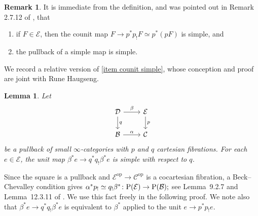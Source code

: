 \documentclass{amsart}
\numberwithin{theorem}{subsection}
\newtheorem{lemma}[theorem]{Lemma}
\theoremstyle{definition}
\newtheorem{remark}[theorem]{Remark}
\providecommand{\op}{\mathrm{op}}
\newcommand{\xE}{\mathcal{E}}
\newcommand{\xcc}{\mathcal{C}}
\newcommand{\Pre}{\name{P}}
\newcommand{\name}[1]{\ensuremath{\text{\textup{#1}}}}
\begin{document}
\begin{remark}\label{remark first simple properties}
It is immediate from the definition, and was pointed out in Remark 2.7.12 of \cite{ChuHaugseng}, that
\begin{enumerate}
\item if $F\in \xE$, then the counit map $F \to p^*p_! F \simeq p^*(pF)$ is simple, and \label{item counit simple}
\item the pullback of a simple map is simple. \label{item pullback simple}
\end{enumerate}
\end{remark}

We record a relative version of \eqref{item counit simple}, whose conception and proof are joint with Rune Haugseng.
\begin{lemma}\label{lemma: relative simple unit}
Let
\begin{equation}\label{eq pullback DEBC} \begin{tikzcd}
\mathcal{D} \rar{\beta} \dar{q} & \xE \dar{p} \\
\mathcal{B} \rar{\alpha} & \xcc
\end{tikzcd} \end{equation}
be a pullback of small $\infty$-categories with $p$ and $q$ cartesian fibrations.
For each $e\in \xE$, the unit map $\beta^*e \to q^*q_!\beta^*e$ is simple with respect to $q$.
\end{lemma}
Since the square is a pullback and $\xE^\op \to \xcc^\op$ is a cocartesian fibration, a Beck--Chevalley condition gives 
$
\alpha^* p_! \simeq q_! \beta^* \colon \Pre(\xE) \to \Pre(\mathcal{B});	
$
see Lemma~9.2.7 and Lemma~12.3.11 of \cite{RiehlVerity:EICT}.
We use this fact freely in the following proof.
We note also that $\beta^*e\to q^*q_! \beta^*e$ is equivalent to $\beta^*$ applied to the unit $e \to p^*p_!e$.
\end{document}
